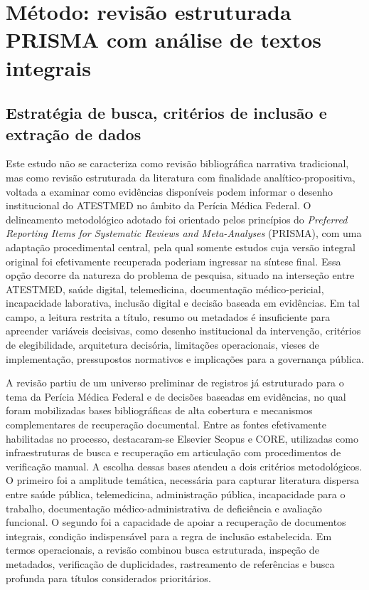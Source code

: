 \documentclass[12pt,a4paper]{article}
\begin{document}
\section{Método: revisão estruturada PRISMA com análise de textos integrais}
\label{sec:org0556ac2}
\subsection{Estratégia de busca, critérios de inclusão e extração de dados}
\label{sec:org1dd127b}

Este estudo não se caracteriza como revisão bibliográfica narrativa tradicional, mas como revisão estruturada da literatura com finalidade analítico-propositiva, voltada a examinar como evidências disponíveis podem informar o desenho institucional do ATESTMED no âmbito da Perícia Médica Federal. O delineamento metodológico adotado foi orientado pelos princípios do \textit{Preferred Reporting Items for Systematic Reviews and Meta-Analyses} (PRISMA), com uma adaptação procedimental central, pela qual somente estudos cuja versão integral original foi efetivamente recuperada poderiam ingressar na síntese final. Essa opção decorre da natureza do problema de pesquisa, situado na interseção entre ATESTMED, saúde digital, telemedicina, documentação médico-pericial, incapacidade laborativa, inclusão digital e decisão baseada em evidências. Em tal campo, a leitura restrita a título, resumo ou metadados é insuficiente para apreender variáveis decisivas, como desenho institucional da intervenção, critérios de elegibilidade, arquitetura decisória, limitações operacionais, vieses de implementação, pressupostos normativos e implicações para a governança pública.

A revisão partiu de um universo preliminar de registros já estruturado para o tema da Perícia Médica Federal e de decisões baseadas em evidências, no qual foram mobilizadas bases bibliográficas de alta cobertura e mecanismos complementares de recuperação documental. Entre as fontes efetivamente habilitadas no processo, destacaram-se Elsevier Scopus e CORE, utilizadas como infraestruturas de busca e recuperação em articulação com procedimentos de verificação manual. A escolha dessas bases atendeu a dois critérios metodológicos. O primeiro foi a amplitude temática, necessária para capturar literatura dispersa entre saúde pública, telemedicina, administração pública, incapacidade para o trabalho, documentação médico-administrativa de deficiência e avaliação funcional. O segundo foi a capacidade de apoiar a recuperação de documentos integrais, condição indispensável para a regra de inclusão estabelecida. Em termos operacionais, a revisão combinou busca estruturada, inspeção de metadados, verificação de duplicidades, rastreamento de referências e busca profunda para títulos considerados prioritários.
\end{document}
